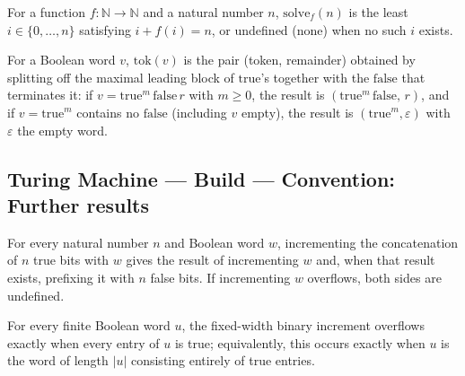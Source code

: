 \begin{definition}
\label{Turing.solveSplitWith}
\leanok
For a function $f : \mathbb{N} \to \mathbb{N}$ and a natural number $n$,
$\mathrm{solve}_f(n)$ is the least $i \in \{0, \dots, n\}$ satisfying
$i + f(i) = n$, or undefined (none) when no such $i$ exists.
\end{definition}

\begin{definition}
\label{Turing.unaryTokenSplit}
\leanok
For a Boolean word $v$, $\mathrm{tok}(v)$ is the pair (token, remainder)
obtained by splitting off the maximal leading block of $\mathrm{true}$'s together with
the $\mathrm{false}$ that terminates it: if $v = \mathrm{true}^m \, \mathrm{false} \, r$
with $m \ge 0$, the result is $(\mathrm{true}^m \, \mathrm{false}, \, r)$, and if
$v = \mathrm{true}^m$ contains no $\mathrm{false}$ (including $v$ empty), the result is
$(\mathrm{true}^m, \varepsilon)$ with $\varepsilon$ the empty word.
\end{definition}

\subsection*{Turing Machine --- Build --- Convention: Further results}

\begin{theorem}
\label{Turing.incFixed_replicate_true_append}
\leanok
{}
For every natural number $n$ and Boolean word $w$, incrementing the concatenation of $n$
true bits with $w$ gives the result of incrementing $w$ and, when that result exists,
prefixing it with $n$ false bits. If incrementing $w$ overflows, both sides are
undefined.
\end{theorem}

\begin{theorem}
\label{Turing.incFixed_eq_none_iff_replicate}
\leanok
{}
For every finite Boolean word $u$, the fixed-width binary increment overflows exactly
when every entry of $u$ is true; equivalently, this occurs exactly when $u$ is the word
of length $|u|$ consisting entirely of true entries.
\end{theorem}
